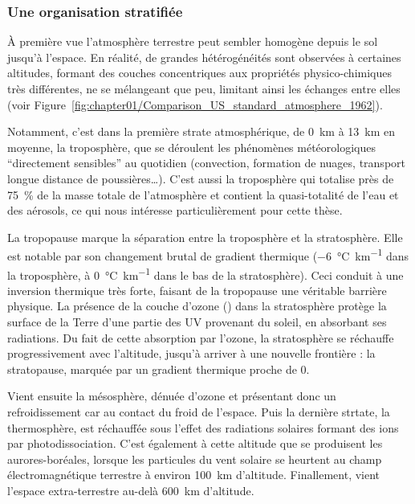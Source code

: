 \subsubsection{Une organisation stratifiée}%
\label{ssub:une_organisation_stratifiée}

À première vue l'atmosphère terrestre peut sembler homogène depuis le sol jusqu'à
l'espace. En réalité, de grandes hétérogénéités sont observées à certaines altitudes,
formant des couches concentriques aux propriétés physico-chimiques très différentes, ne se
mélangeant que peu, limitant ainsi les échanges entre elles (voir
Figure~\ref{fig:chapter01/Comparison_US_standard_atmosphere_1962}).

Notamment, c'est dans la première strate atmosphérique, de \SI{0}{km} à \SI{13}{km} en
moyenne, la troposphère, que se déroulent les phénomènes météorologiques
``directement sensibles'' au quotidien
(convection, formation de nuages, transport longue distance de poussières…).
C'est aussi la troposphère qui totalise près de \SI{75}{\percent} de la masse totale
de l'atmosphère et contient la quasi-totalité de l'eau et des aérosols, ce qui nous
intéresse particulièrement pour cette thèse.

La tropopause marque la séparation entre la troposphère et la stratosphère. Elle est
notable par son changement brutal de gradient thermique (\SI{-6}{\degreeCelsius\per\km}
dans la troposphère, à \SI{0}{\degreeCelsius\per\km} dans le bas de la stratosphère).
Ceci conduit à une inversion thermique très forte, faisant de la tropopause une véritable
barrière physique. La présence de la couche d'ozone () dans la stratosphère
protège la surface de la Terre d'une partie des UV provenant du soleil, en absorbant ses
radiations. Du fait de cette absorption par l'ozone, la stratosphère se réchauffe
progressivement avec l'altitude, jusqu'à arriver à une nouvelle frontière : la
stratopause, marquée par un gradient thermique proche de 0.

Vient ensuite la mésosphère, dénuée d'ozone et présentant donc un refroidissement car au
contact du froid de l'espace. Puis la dernière strtate, la thermosphère, est réchauffée
sous l'effet des radiations solaires formant des ions par photodissociation.
C'est également à cette altitude que se produisent les aurores-boréales, lorsque les
particules du vent solaire se heurtent au champ électromagnétique terrestre à environ
\SI{100}{km} d'altitude. Finallement, vient l'espace extra-terrestre au-delà \SI{600}{km}
d'altitude.

